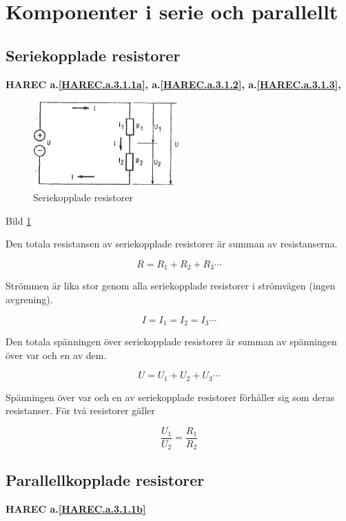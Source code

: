 \section{Komponenter i serie och parallellt}

\subsection{Seriekopplade resistorer}
\textbf{HAREC
  a.\ref{HAREC.a.3.1.1a}\label{myHAREC.a.3.1.1a},
  a.\ref{HAREC.a.3.1.2}\label{myHAREC.a.3.1.2a},
  a.\ref{HAREC.a.3.1.3}\label{myHAREC.a.3.1.3a},
}

\begin{figure}
\includegraphics[width=0.5\textwidth]{images/cropped_pdfs/bild_2_3-01.pdf}
\caption{Seriekopplade resistorer}
\label{fig:BildII3-01}
\end{figure}

Bild \ref{fig:BildII3-01}

Den totala resistansen av seriekopplade resistorer är summan av resistanserna.

\[R = R_1 + R_2 + R_3 \cdots \]

Strömmen är lika stor genom alla seriekopplade resistorer i strömvägen (ingen
avgrening).

\[I = I_1 = I_2 = I_3 \cdots \]

Den totala spänningen över seriekopplade resistorer är summan av spänningen över
var och en av dem.

\[U = U_1 + U_2 + U_3 \cdots \]

Spänningen över var och en av seriekopplade resistorer förhåller sig som deras
resistanser. För två resistorer gäller

\[\frac{U_1}{U_2} = \frac{R_1}{R_2}\]


\subsection{Parallellkopplade resistorer}
\textbf{HAREC a.\ref{HAREC.a.3.1.1b}\label{myHAREC.a.3.1.1b}}

